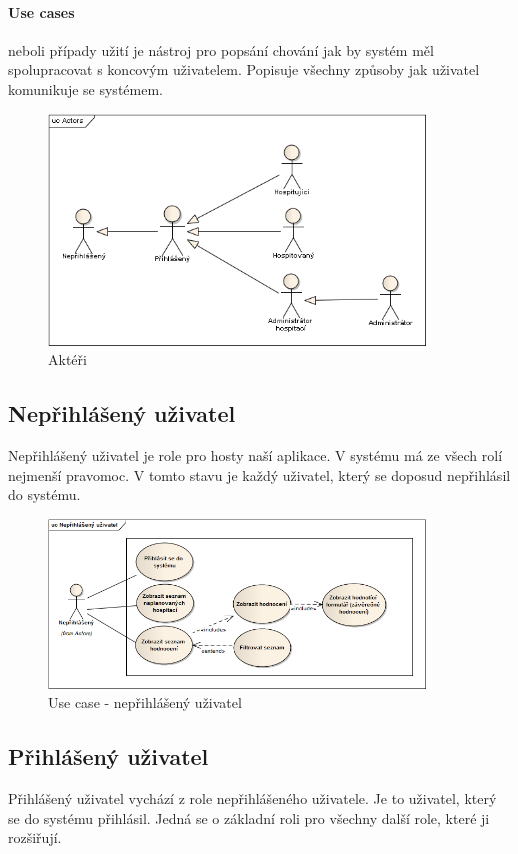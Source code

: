 \paragraph*{Use cases}
neboli případy užití je nástroj pro popsání chování jak by systém měl spolupracovat s koncovým uživatelem. Popisuje všechny způsoby jak uživatel komunikuje se systémem.

\begin{figure}[H]
\begin{center}
\includegraphics[width=10cm]{figures/Actors}
\caption{Aktéři}
\label{fig:actors}
\end{center}
\end{figure}

\subsection{Nepřihlášený uživatel}
Nepřihlášený uživatel je role pro hosty naší aplikace. V systému má ze všech rolí nejmenší pravomoc. V tomto stavu je každý uživatel, který se doposud nepřihlásil do systému.

\begin{figure}[H]
\begin{center}
\includegraphics[width=10cm]{figures/actor_base}
\caption{Use case - nepřihlášený uživatel}
\label{fig:actor_base}
\end{center}
\end{figure}

\subsection{Přihlášený uživatel}
Přihlášený uživatel vychází z role nepřihlášeného uživatele. Je to uživatel, který se do systému přihlásil. Jedná se o základní roli pro všechny další role, které ji rozšiřují.

